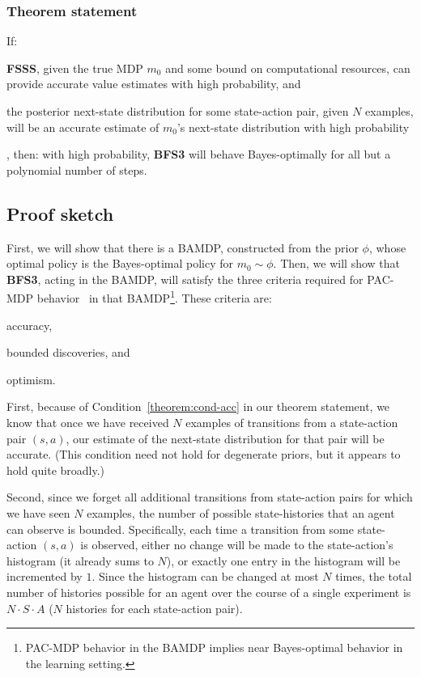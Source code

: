 \subsubsection{Theorem statement}

If: \begin{inparaenum} \item \label{theorem:cond-fsss} {\bf FSSS}, given the true MDP $m_0$ and some bound on computational resources, can provide accurate value estimates with high probability, and \item \label{theorem:cond-acc} the posterior next-state distribution for some state-action pair, given $N$ examples, will be an accurate estimate of $m_0$'s next-state distribution with high probability\end{inparaenum}, then: with high probability, {\bf BFS3} will behave Bayes-optimally for all but a polynomial number of steps.

\subsection{Proof sketch}


First, we will show that there is a BAMDP, constructed from the prior $\phi$, whose optimal policy is the Bayes-optimal policy for $m_0\sim \phi$. Then, we will show that {\bf BFS3}, acting in the BAMDP, will satisfy the three criteria required for PAC-MDP behavior~\cite{kakade03,lihong09abr2} in that BAMDP\footnote{PAC-MDP behavior in the BAMDP implies near Bayes-optimal behavior in the learning setting.}.
These criteria are: \begin{inparaenum} \item accuracy, \item bounded discoveries, and \item optimism. \end{inparaenum}

First, because of Condition~\ref{theorem:cond-acc} in our theorem statement, we know that once we have received $N$ examples of transitions from a state-action pair $(s,a)$, our estimate of the next-state distribution for that pair will be accurate.  (This condition need not hold for degenerate priors, but it appears to hold quite broadly.)

Second, since we forget all additional transitions from state-action pairs for which we have seen $N$ examples, the number of possible state-histories that an agent can observe is bounded.  Specifically, each time a transition from some state-action $(s,a)$ is observed, either no change will be made to the state-action's histogram (it already sums to $N$), or exactly one entry in the histogram will be incremented by $1$.  Since the histogram can be changed at most $N$ times, the total number of histories possible for an agent over the course of a single experiment is $N \cdot S \cdot A$ ($N$ histories for each state-action pair).

